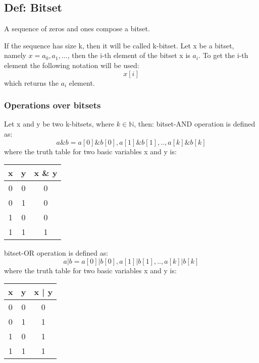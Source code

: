 \documentclass{article}
\begin{document}
	\subsection*{Def: Bitset}
		A sequence of zeros and ones compose a bitset.

		If the sequence has size k, then it will be called k-bitset.
		\newline
		\newline
		Let x be a bitset, namely $x = a_0, a_1, ...$, then the i-th element of the bitset x is $a_i$. 
		To get the i-th element the following notation will be used:
		\begin{equation}
			x[i]
		\end{equation}
		which returns the $a_i$ element.

		\subsubsection*{Operations over bitsets}
			Let x and y be two k-bitsets, where $k \in \mathbb{N}$, then: 
			\newline
			\newline
			bitset-AND operation is defined as:
			\begin{equation}
				a \& b = a[0] \& b[0], a[1] \& b[1], .. , a[k] \& b[k]
			\end{equation}
			where the truth table for two basic variables x and y is:
			\newline
			\begin{tabular}{cc|c}
				x & y & x \& y \\
				\hline
				0 & 0 & 0 \\
				0 & 1 & 0 \\
				1 & 0 & 0 \\
				1 & 1 & 1 \\
			\end{tabular} 
			\newline
			bitset-OR operation is defined as:
			\begin{equation}
				a | b = a[0] | b[0], a[1] | b[1], .. , a[k] | b[k]
			\end{equation}
			where the truth table for two basic variables x and y is:
			\newline
			\begin{tabular}{cc|c}
				x & y & x | y \\
				\hline
				0 & 0 & 0 \\
				0 & 1 & 1 \\
				1 & 0 & 1 \\
				1 & 1 & 1 \\
			\end{tabular} 
\end{document}
